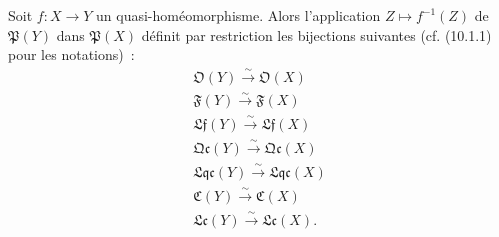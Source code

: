 \begin{proposition}[10.2.7]
\label{IV.10.2.7-fr}
Soit $f:X\to Y$ un quasi-homéomorphisme. Alors l'application
$Z\mapsto f^{-1}(Z)$ de $\mathfrak P(Y)$ dans $\mathfrak P(X)$ définit par
restriction les bijections suivantes (cf. (10.1.1) pour les notations)~:
\[
\begin{gathered}
\mathfrak O(Y)\xrightarrow{\sim}\mathfrak O(X)\\
\mathfrak F(Y)\xrightarrow{\sim}\mathfrak F(X)\\
\mathfrak{Lf}(Y)\xrightarrow{\sim}\mathfrak{Lf}(X)\\
\mathfrak{Qc}(Y)\xrightarrow{\sim}\mathfrak{Qc}(X)\\
\mathfrak{Lqc}(Y)\xrightarrow{\sim}\mathfrak{Lqc}(X)\\
\mathfrak C(Y)\xrightarrow{\sim}\mathfrak C(X)\\
\mathfrak{Lc}(Y)\xrightarrow{\sim}\mathfrak{Lc}(X).
\end{gathered}
\]
\end{proposition}


